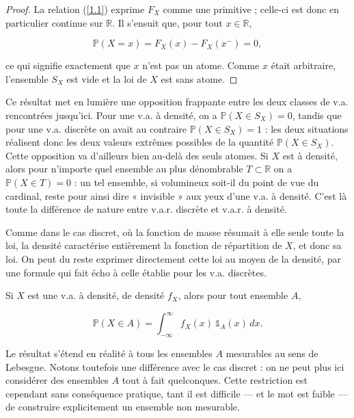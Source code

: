 \begin{proof}
La relation (\ref{1.1}) exprime $F_X$ comme une primitive ; celle-ci est donc en particulier continue sur $\mathbb{R}$. Il s'ensuit que, pour tout $x \in \mathbb{R}$,

$$
\mathbb{P}(X = x) = F_X(x) - F_X(x^-) = 0,
$$

ce qui signifie exactement que $x$ n'est pas un atome. Comme $x$ était arbitraire, l'ensemble $S_X$ est vide et la loi de $X$ est sans atome.
\end{proof}

Ce résultat met en lumière une opposition frappante entre les deux classes de v.a. rencontrées jusqu'ici. Pour une v.a. à densité, on a $\mathbb{P}(X \in S_X) = 0$, tandis que pour une v.a. discrète on avait au contraire $\mathbb{P}(X \in S_X) = 1$ : les deux situations réalisent donc les deux valeurs extrêmes possibles de la quantité $\mathbb{P}(X \in S_X)$. Cette opposition va d'ailleurs bien au-delà des seuls atomes. Si $X$ est à densité, alors pour n'importe quel ensemble au plus dénombrable $T \subset \mathbb{R}$ on a $\mathbb{P}(X \in T) = 0$ : un tel ensemble, si volumineux soit-il du point de vue du cardinal, reste pour ainsi dire « invisible » aux yeux d'une v.a. à densité. C'est là toute la différence de nature entre v.a.r. discrète et v.a.r. à densité.

Comme dans le cas discret, où la fonction de masse résumait à elle seule toute la loi, la densité caractérise entièrement la fonction de répartition de $X$, et donc sa loi. On peut du reste exprimer directement cette loi au moyen de la densité, par une formule qui fait écho à celle établie pour les v.a. discrètes.

\medskip

\begin{mdframed}
\begin{proposition}
Si $X$ est une v.a. à densité, de densité $f_X$, alors pour tout ensemble $A$,

$$
\mathbb{P}(X \in A) = \int_{-\infty}^{\infty} f_X(x)\, \mathbb{1}_A(x)\, dx.
$$
\end{proposition}
\end{mdframed}

\begin{remarque}
Le résultat s'étend en réalité à tous les ensembles $A$ mesurables au sens de Lebesgue. Notons toutefois une différence avec le cas discret : on ne peut plus ici considérer des ensembles $A$ tout à fait quelconques. Cette restriction est cependant sans conséquence pratique, tant il est difficile — et le mot est faible — de construire explicitement un ensemble non mesurable.
\end{remarque}

